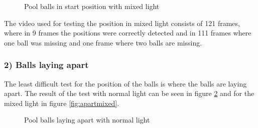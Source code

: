 \begin{figure}[H]
  \centering
\quad
\quad
   \caption{Pool balls in start position with mixed light}
  \label{fig:poolposstart2}
\end{figure}

The video used for testing the position in mixed light consists of 121 frames, where in 9 frames the positions were correctly detected and in 111 frames where one ball was missing and one frame where two balls are missing.

\subsubsection{ 2) Balls laying apart}
The least difficult test for the position of the balls is where the balls are laying apart. The result of the test with normal light can be seen in figure \ref{fig:apartnormal} and for the mixed light in figure \ref{fig:apartmixed}.

\begin{figure}[H]
  \centering
\quad
\quad
   \caption{Pool balls laying apart with normal light}
  \label{fig:apartnormal}
\end{figure}

